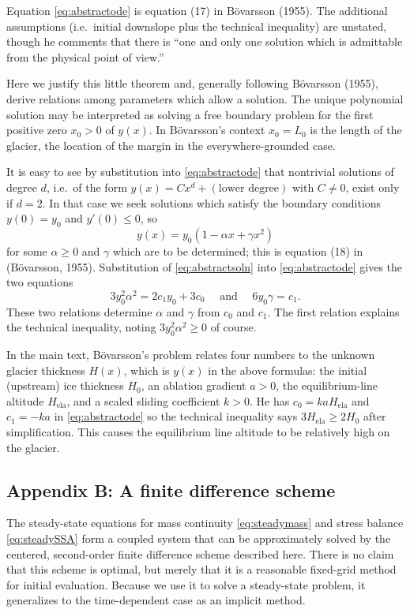 \documentclass[twocolumn]{igs}
\renewcommand{\dh}{\fontencoding{T1}\selectfont{\symbol{240}}}
\newcommand{\bod}{B\"o\dh varsson\xspace}
\newcommand{\citebod}{B\"o\dh varsson (1955)\nocite{Bodvardsson}\xspace}
\newcommand{\citepbod}{(B\"o\dh varsson, 1955)\nocite{Bodvardsson}\xspace}
\newcommand{\Hela}{H_{\text{ela}}}
\begin{document}
Equation \eqref{eq:abstractode} is equation (17) in \citebod.  The additional assumptions (i.e.~initial downslope plus the technical inequality) are unstated, though he comments that there is ``one and only one solution which is admittable from the physical point of view.''

Here we justify this little theorem and, generally following \citebod, derive relations among parameters which allow a solution.  The unique polynomial solution may be interpreted as solving a free boundary problem for the first positive zero $x_0>0$ of $y(x)$.  In \bod's context $x_0=L_0$ is the length of the glacier, the location of the margin in the everywhere-grounded case.

It is easy to see by substitution into \eqref{eq:abstractode} that nontrivial solutions of degree $d$, i.e.~of the form $y(x) = C x^d + (\text{lower degree})$ with $C \ne 0$, exist only if $d=2$.  In that case we seek solutions which satisfy the boundary conditions $y(0)=y_0$ and $y'(0) \le 0$, so
\begin{equation}
y(x) = y_0(1 - \alpha x + \gamma x^2)  \label{eq:abstractsoln}
\end{equation}
for some $\alpha\ge 0$ and $\gamma$ which are to be determined; this is equation (18) in \citepbod.  Substitution of \eqref{eq:abstractsoln} into \eqref{eq:abstractode} gives the two equations
\begin{equation}
3 y_0^2 \alpha^2 = 2 c_1 y_0 + 3 c_0 \quad \text{ and } \quad 6 y_0 \gamma = c_1.  \label{eq:abstractrelations}
\end{equation}
These two relations determine $\alpha$ and $\gamma$ from $c_0$ and $c_1$.  The first relation explains the technical inequality, noting $3 y_0^2 \alpha^2 \ge 0$ of course.

In the main text, \bod's problem relates four numbers to the unknown glacier thickness $H(x)$, which is $y(x)$ in the above formulas: the initial (upstream) ice thickness $H_0$, an ablation gradient $a>0$, the equilibrium-line altitude $\Hela$, and a scaled sliding coefficient $k>0$.  He has $c_0=k a \Hela$ and $c_1=-ka$ in \eqref{eq:abstractode} so the technical inequality says $3 \Hela \ge 2 H_0$ after simplification.  This causes the equilibrium line altitude to be relatively high on the glacier.


\subsection{Appendix B: A finite difference scheme}  The steady-state equations for mass continuity \eqref{eq:steadymass} and stress balance \eqref{eq:steadySSA} form a coupled system that can be approximately solved by the centered, second-order finite difference scheme described here.  There is no claim that this scheme is optimal, but merely that it is a reasonable fixed-grid method for initial evaluation.  Because we use it to solve a steady-state problem, it generalizes to the time-dependent case as an implicit method.
\end{document}
